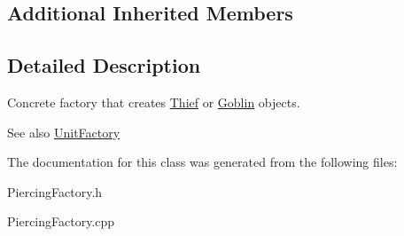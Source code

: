 \subsection*{Additional Inherited Members}


\subsection{Detailed Description}
Concrete factory that creates \hyperlink{class_thief}{Thief} or \hyperlink{class_goblin}{Goblin} objects. 

\begin{DoxySeeAlso}{See also}
\hyperlink{class_unit_factory}{Unit\+Factory} 
\end{DoxySeeAlso}


The documentation for this class was generated from the following files\+:\begin{DoxyCompactItemize}
\item 
Piercing\+Factory.\+h\item 
Piercing\+Factory.\+cpp\end{DoxyCompactItemize}
